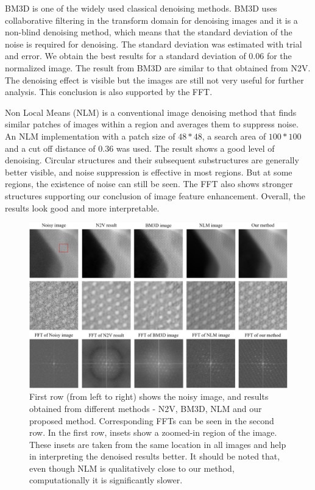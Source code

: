 \documentclass[fleqn,10pt]{wlscirep}
\begin{document}
	BM3D \cite{DBLP:journals/tip/BM3D} is one of the widely used classical denoising methods. BM3D uses collaborative filtering in the transform domain for denoising images and it is a non-blind denoising method, which means that the standard deviation of the noise is required for denoising. The standard deviation was estimated with trial and error. We obtain the best results for a standard deviation of 0.06 for the normalized image. The result from BM3D are similar to that obtained from N2V. The denoising effect is visible but the images are still not very useful for further analysis. This conclusion is also supported by the FFT.
	
		
	Non Local Means (NLM) \cite{bcm_nlm} is a conventional image denoising method that finds similar patches of images within a region and averages them to suppress noise. An NLM implementation with a patch size of $48*48$, a search area of $100*100$ and a cut off distance of 0.36 was used. The result shows a good level of denoising. Circular structures and their subsequent substructures are generally better visible, and noise suppression is effective in most regions. But at some regions, the existence of noise can still be seen. The FFT also shows stronger structures supporting our conclusion of image feature enhancement. Overall, the results look good and more interpretable. 
	
	\begin{figure}
		\centering
		\includegraphics[scale=0.4]{./imgs/comparison-zoomed.jpg}
		\caption{First row (from left to right) shows the noisy image, and results obtained from different methods - N2V, BM3D, NLM and our proposed method. Corresponding FFTs can be seen in the second row. In the first row, insets show a zoomed-in region of the image. These insets are taken from the same location in all images and help in interpreting the denoised results better. It should be noted that, even though NLM is qualitatively close to our method, computationally it is significantly slower. }
		\label{fig:comparison}
	\end{figure}
		
\end{document}
